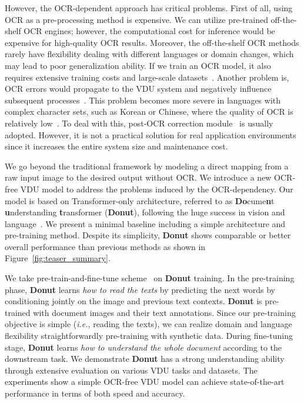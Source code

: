 \documentclass[runningheads]{llncs}
\newcommand\oursb{{\textbf{\mbox{Donut}}}\xspace}
\begin{document}
However, the OCR-dependent approach has critical problems.
First of all, using OCR as a pre-processing method is expensive.
We can utilize pre-trained off-the-shelf OCR engines; however, the computational cost for inference would be expensive for high-quality OCR results. 
Moreover, the off-the-shelf OCR methods rarely have flexibility dealing with different languages or domain changes, which may lead to poor generalization ability. 
If we train an OCR model, it also requires extensive training costs and large-scale datasets~\cite{baek2019craft,baek2019wrong,Liu_2020_CVPR,spts}.
Another problem is, OCR errors would propagate to the VDU system and negatively influence subsequent processes~\cite{ocr_error_negative,hwang2021costeffective}. This problem becomes more severe in languages with complex character sets, such as Korean or Chinese, where the quality of OCR is relatively low~\cite{rijhwani-etal-2020-ocr}.
To deal with this, post-OCR correction module~\cite{schaefer-neudecker-2020-two,rijhwani-etal-2020-ocr,duong-etal-2021-unsupervised} is usually adopted. However, it is not a practical solution for real application environments since it increases the entire system size and maintenance cost.


We go beyond the traditional framework by modeling a direct mapping from a raw input image to the desired output without OCR.
We introduce a new OCR-free VDU model to address the problems induced by the OCR-dependency.
Our model is based on Transformer-only architecture, referred to as \textbf{Do}cume\textbf{n}t \textbf{u}nderstanding \textbf{t}ransformer (\oursb), following the huge success in vision and language~\cite{devlinBERT2018,dosovitskiy2020vit,pmlr-v139-kim21k}.
We present a minimal baseline including a simple architecture and pre-training method. 
Despite its simplicity, \oursb shows comparable or better overall performance than previous methods as shown in Figure~\ref{fig:teaser_summary}. 

We take pre-train-and-fine-tune scheme~\cite{devlinBERT2018,xu2019_layoutLM} on \oursb training. 
In the pre-training phase, \oursb learns \textit{how to read the texts} by predicting the next words by conditioning jointly on the image and previous text contexts. 
\oursb is pre-trained with document images and their text annotations. 
Since our pre-training objective is simple (\textit{i.e.}, reading the texts), we can realize domain and language flexibility straightforwardly pre-training with synthetic data.
During fine-tuning stage, \oursb learns \textit{how to understand the whole document} according to the downstream task. 
We demonstrate \oursb has a strong understanding ability through extensive evaluation on various VDU tasks and datasets. 
The experiments show a simple OCR-free VDU model can achieve state-of-the-art performance in terms of both speed and accuracy. 
\end{document}
